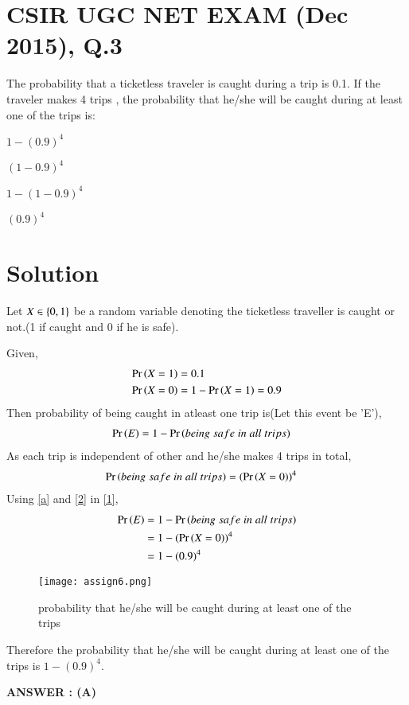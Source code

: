 \documentclass[journal,12pt,twocolumn]{IEEEtran}
\begin{document}
\section{CSIR UGC NET EXAM (Dec 2015), Q.3}
The probability that a ticketless traveler is caught during a trip is 0.1. If the traveler makes 4 trips , the probability that he/she will be caught during at least one of the trips is:\\
\begin{inparaenum}[(A)]
    \item $1-(0.9)^4$\hspace{2.6cm}
    \item $(1-0.9)^4$\hspace{0.5cm}\\
    \item $1-(1-0.9)^4$\hspace{2cm}
    \item $(0.9)^4$
\end{inparaenum}

\section{Solution}
Let $X\in\left\{0,1\right\}$ be a random variable denoting the ticketless traveller is caught or not.(1 if caught and 0 if he is safe).

Given,
\begin{align}
     \Pr\left(X=1\right)&=0.1 \\
     \Pr\left(X=0\right)&=1-\Pr\left(X=1\right)=0.9\label{a}
\end{align}
Then probability of being caught in atleast one trip is(Let this event be 'E'),
\begin{align}
    \Pr\left(E\right)&=1-\Pr\left(being \;safe \;in \;all \;trips\right)\label{1}
\end{align}
As each trip is independent of other and he/she makes 4 trips in total,
\begin{align}
    \Pr\left(being \;safe \;in \;all\;trips\right)&=(\Pr\left(X=0\right))^4 \label{2}
\end{align}
Using \eqref{a} and \eqref{2} in \eqref{1},
\begin{align}
    \Pr\left(E\right)&=1-\Pr\left(being \;safe \;in \;all \;trips\right)\\
    &=1-(\Pr\left(X=0\right))^4\\
    &=1-(0.9)^4
\end{align}
\begin{figure}[t]
    \centering
    \texttt{[image: assign6.png]}
    \caption{probability that he/she will be caught during at least one of the trips}
\end{figure}
Therefore the probability that he/she will be caught during at least one of the trips is $1-(0.9)^4$.

\textbf{ANSWER : (A)}
\end{document}
